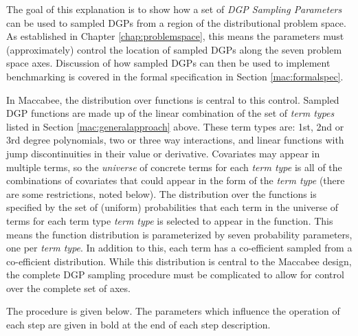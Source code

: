 \documentclass[../main.tex]{subfiles}
\begin{document}
\vspace{\baselineskip}

The goal of this explanation is to show how a set of \textit{DGP Sampling Parameters} can be used to sampled DGPs from a region of the distributional problem space. As established in Chapter \ref{chap:problemspace}, this means the parameters must (approximately) control the location of sampled DGPs along the seven problem space axes. Discussion of how sampled DGPs can then be used to implement benchmarking is covered in the formal specification in Section \ref{mac:formalspec}.

\vspace{\baselineskip}

In Maccabee, the distribution over functions is central to this control. Sampled DGP functions are made up of the linear combination of the set of \textit{term types} listed in Section \ref{mac:generalapproach} above. These term types are: 1st, 2nd or 3rd degree polynomials, two or three way interactions, and linear functions with jump discontinuities in their value or derivative. Covariates may appear in multiple terms, so the \textit{universe} of concrete terms for each \textit{term type} is all of the combinations of covariates that could appear in the form of the \textit{term type} (there are some restrictions, noted below). The distribution over the functions is specified by the set of (uniform) probabilities that each term in the universe of terms for each term type \textit{term type} is selected to appear in the function. This means the function distribution is parameterized by seven probability parameters, one per \textit{term type}. In addition to this, each term has a co-efficient sampled from a co-efficient distribution. While this distribution is central to the Maccabee design, the complete DGP sampling procedure must be complicated to allow for control over the complete set of axes.

\vspace{\baselineskip}

The procedure is given below. The parameters which influence the operation of each step are given in bold at the end of each step description.
\end{document}
